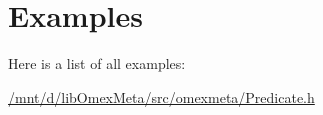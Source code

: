 \section{Examples}
Here is a list of all examples\+:\begin{DoxyCompactItemize}
\item 
\hyperlink{_2mnt_2d_2libOmexMeta_2src_2omexmeta_2Predicate_8h-example}{/mnt/d/lib\+Omex\+Meta/src/omexmeta/\+Predicate.\+h}
\end{DoxyCompactItemize}
